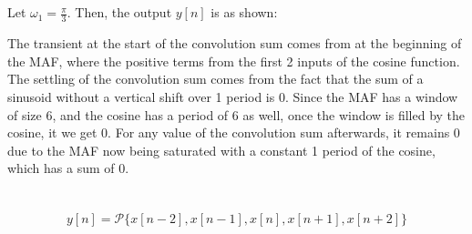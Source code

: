 \documentclass{article}
\begin{document}
\subsection{}

Let \(\omega_1 = \frac{\pi}{3}\).
Then, the output \(y[n]\) is as shown:
\begin{center}
\end{center}
The transient at the start of the convolution sum comes from at the beginning of the MAF, where the positive terms from the first 2 inputs of the cosine function.
The settling of the convolution sum comes from the fact that the sum of a sinusoid without a vertical shift over 1 period is 0. Since the MAF has a window of size 6, and the cosine has a period of 6 as well, once the window is filled by the cosine, it we get 0.
For any value of the convolution sum afterwards, it remains 0 due to the MAF now being saturated with a constant 1 period of the cosine, which has a sum of 0.

\newpage
\section{}

\begin{equation}
    y[n] = \mathcal{P}\{x[n - 2], x[n - 1], x[n], x[n + 1], x[n + 2]\}
\end{equation}

\subsection{}
\end{document}
